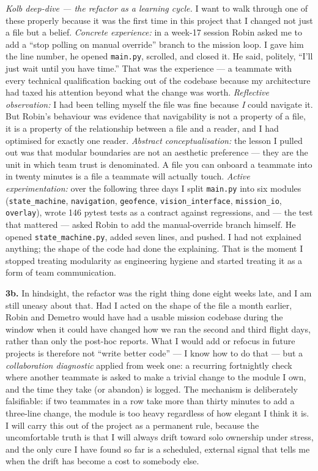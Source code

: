\emph{Kolb deep-dive --- the refactor as a learning cycle.} I want to walk through one of these properly because it was the first time in this project that I changed not just a file but a belief. \textit{Concrete experience:} in a week-17 session Robin asked me to add a ``stop polling on manual override'' branch to the mission loop. I gave him the line number, he opened \texttt{main.py}, scrolled, and closed it. He said, politely, ``I'll just wait until you have time.'' That was the experience --- a teammate with every technical qualification backing out of the codebase because my architecture had taxed his attention beyond what the change was worth. \textit{Reflective observation:} I had been telling myself the file was fine because \emph{I} could navigate it. But Robin's behaviour was evidence that navigability is not a property of a file, it is a property of the relationship between a file and a reader, and I had optimised for exactly one reader. \textit{Abstract conceptualisation:} the lesson I pulled out was that modular boundaries are not an aesthetic preference --- they are the unit in which team trust is denominated. A file you can onboard a teammate into in twenty minutes is a file a teammate will actually touch. \textit{Active experimentation:} over the following three days I split \texttt{main.py} into six modules (\texttt{state\_machine}, \texttt{navigation}, \texttt{geofence}, \texttt{vision\_interface}, \texttt{mission\_io}, \texttt{overlay}), wrote 146 pytest tests as a contract against regressions, and --- the test that mattered --- asked Robin to add the manual-override branch himself. He opened \texttt{state\_machine.py}, added seven lines, and pushed. I had not explained anything; the shape of the code had done the explaining. That is the moment I stopped treating modularity as engineering hygiene and started treating it as a form of team communication.

\textbf{3b.} In hindsight, the refactor was the right thing done eight weeks late, and I am still uneasy about that. Had I acted on the shape of the file a month earlier, Robin and Demetro would have had a usable mission codebase during the window when it could have changed how we ran the second and third flight days, rather than only the post-hoc reports. What I would add or refocus in future projects is therefore not ``write better code'' --- I know how to do that --- but a \emph{collaboration diagnostic} applied from week one: a recurring fortnightly check where another teammate is asked to make a trivial change to the module I own, and the time they take (or abandon) is logged. The mechanism is deliberately falsifiable: if two teammates in a row take more than thirty minutes to add a three-line change, the module is too heavy regardless of how elegant I think it is. I will carry this out of the project as a permanent rule, because the uncomfortable truth is that I will always drift toward solo ownership under stress, and the only cure I have found so far is a scheduled, external signal that tells me when the drift has become a cost to somebody else.
